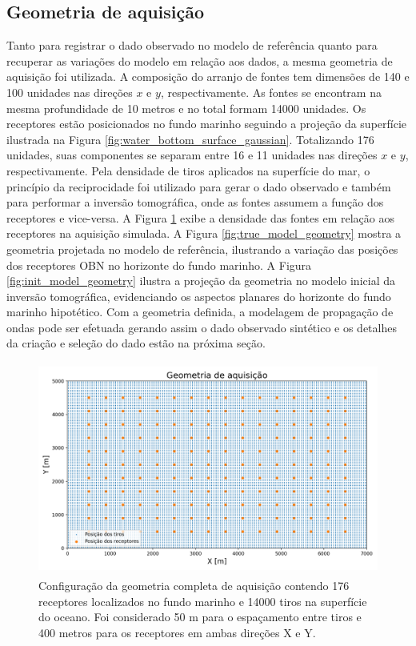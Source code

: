 \subsection{Geometria de aquisição}

Tanto para registrar o dado observado no modelo de referência quanto para recuperar as variações do modelo em relação aos dados, a mesma geometria de aquisição foi utilizada. A composição do arranjo de fontes tem dimensões de 140 e 100 unidades nas direções $x$ e $y$, respectivamente. As fontes se encontram na mesma profundidade de 10 metros e no total formam 14000 unidades. Os receptores estão posicionados no fundo marinho seguindo a projeção da superfície ilustrada na Figura \ref{fig:water_bottom_surface_gaussian}. Totalizando 176 unidades, suas componentes se separam entre 16 e 11 unidades nas direções $x$ e $y$, respectivamente. Pela densidade de tiros aplicados na superfície do mar, o princípio da reciprocidade foi utilizado para gerar o dado observado e também para performar a inversão tomográfica, onde as fontes assumem a função dos receptores e vice-versa. A Figura \ref{fig:complete_geometry} exibe a densidade das fontes em relação aos receptores na aquisição simulada. A Figura \ref{fig:true_model_geometry} mostra a geometria projetada no modelo de referência, ilustrando a variação das posições dos receptores OBN no horizonte do fundo marinho. A Figura \ref{fig:init_model_geometry} ilustra a projeção da geometria no modelo inicial da inversão tomográfica, evidenciando os aspectos planares do horizonte do fundo marinho hipotético. Com a geometria definida, a modelagem de propagação de ondas pode ser efetuada gerando assim o dado observado sintético e os detalhes da criação e seleção do dado estão na próxima seção. 
\begin{figure}[H]
	\centering
	\includegraphics[width=12cm,height=7cm]{Imgs/Metodologia/complete_geometry.png}
	\caption{Configuração da geometria completa de aquisição contendo 176 receptores localizados no fundo marinho e 14000 tiros na superfície do oceano. Foi considerado 50 m para o espaçamento entre tiros e 400 metros para os receptores em ambas direções X e Y.}
	\label{fig:complete_geometry}	
\end{figure}
